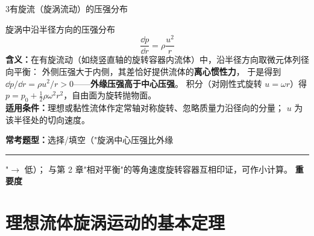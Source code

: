 \begin{kaodian}{3}{有旋流（旋涡流动）的压强分布}
\begin{gongshi}{旋涡中沿半径方向的压强分布}
\[ \frac{\dd p}{\dd r}=\rho\frac{u^2}{r} \]
\textbf{含义：}在有旋流动（如绕竖直轴的旋转容器内流体）中，沿半径方向取微元体列径向平衡：
外侧压强大于内侧，其差恰好提供流体的\textbf{离心惯性力}，
于是得到 $\dd p/\dd r=\rho u^2/r>0$——\textbf{外缘压强高于中心压强}。
积分（对刚性式旋转 $u=\omega r$）得 $p=p_0+\frac12\rho\omega^2r^2$，自由面为旋转抛物面。\\
\textbf{适用条件：}理想或黏性流体作定常轴对称旋转、忽略质量力沿径向的分量；
$u$ 为该半径处的切向速度。
\end{gongshi}
\textbf{常考题型：}选择/填空（"旋涡中心压强比外缘\rule{1.2cm}{0.4pt}"$\to$ 低）；
与第 2 章"相对平衡"的等角速度旋转容器互相印证，可作小计算。
\textbf{重要度 }\quad{}\quad{}
\end{kaodian}

\section{理想流体旋涡运动的基本定理}

